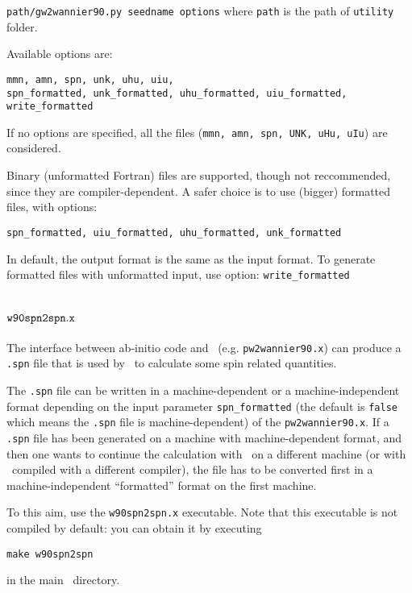 \verb|path/gw2wannier90.py seedname options|
\newline \newline
where \verb|path| is the path of \verb|utility| folder.\newline\newline

Available options are:
\begin{verbatim}
mmn, amn, spn, unk, uhu, uiu,
spn_formatted, unk_formatted, uhu_formatted, uiu_formatted,
write_formatted
\end{verbatim}

If no options are specified, all the files (\verb|mmn, amn, spn, UNK, uHu, uIu|) are considered.

Binary (unformatted Fortran) files are supported, though not reccommended,
since they are compiler-dependent.
A safer choice is to use (bigger) formatted files, with options:

\verb|spn_formatted, uiu_formatted, uhu_formatted, unk_formatted|

In default, the output format is the same as the input format.
To generate formatted files with unformatted input, use option:
\verb|write_formatted|
\label{sec:w90aaa}

\section{$\tt{w90spn2spn.x}$\label{sec:w90spn2spn}}
The interface between ab-initio code and \wannier\
(e.g. \texttt{pw2wannier90.x}) can produce a
\verb|.spn| file that is used by \postw\ to
calculate some spin related quantities.

The \verb|.spn| file can be
written in a machine-dependent or a machine-independent format
depending on the input parameter \texttt{spn\_formatted}
(the default is \texttt{false} which means the \verb|.spn| file
is machine-dependent) of the
\texttt{pw2wannier90.x}. If a \verb|.spn| file has been generated
on a machine with machine-dependent format,
and then one wants to continue the calculation
with \postw\ on a different machine
(or with \postw\ compiled with a different compiler),
the file has to be converted first in a machine-independent
``formatted'' format on the first machine.

To this aim, use the \verb|w90spn2spn.x| executable. Note that this
executable is not compiled by default: you can obtain it by executing
\begin{verbatim}
make w90spn2spn
\end{verbatim}
in the main \wannier\ directory.

